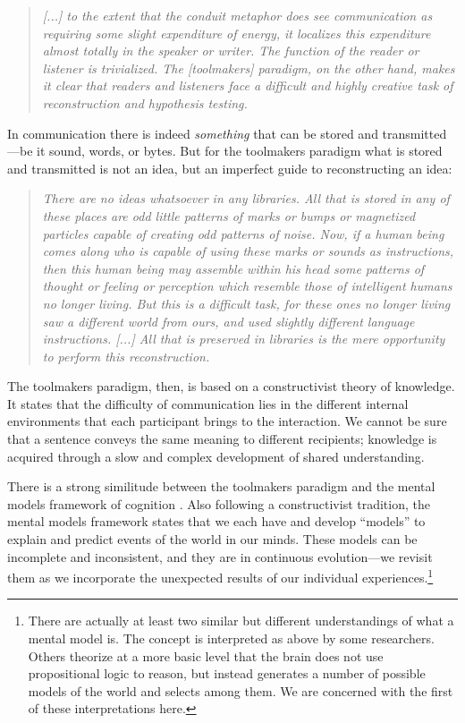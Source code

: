 \begin{quote}
\emph{[...] to the extent that the conduit metaphor does see communication as requiring some slight expenditure of energy, it localizes this expenditure almost totally in the speaker or writer. The function of the reader or listener is trivialized. The [toolmakers] paradigm, on the other hand, makes it clear that readers and listeners face a difficult and highly creative task of reconstruction and hypothesis testing.}
\end{quote}

In communication there is indeed \emph{something} that can be stored and transmitted---be it sound, words, or bytes. But for the toolmakers paradigm what is stored and transmitted is not an idea, but an imperfect guide to reconstructing an idea:

\begin{quote}
\emph{There are no ideas whatsoever in any libraries. All that is stored in any of these places are odd little patterns of marks or bumps or magnetized particles capable of creating odd patterns of noise. Now, if a human being comes along who is capable of using these marks or sounds as instructions, then this human being may assemble within his head some patterns of thought or feeling or perception which resemble those of intelligent humans no longer living. But this is a difficult task, for these ones no longer living saw a different world from ours, and used slightly different language instructions. [...] All that is preserved in libraries is the mere opportunity to perform this reconstruction.}
\end{quote}

The toolmakers paradigm, then, is based on a constructivist theory of knowledge. It states that the difficulty of communication lies in the different internal environments that each participant brings to the interaction. We cannot be sure that a sentence conveys the same meaning to different recipients; knowledge is acquired through a slow and complex development of shared understanding.

There is a strong similitude between the toolmakers paradigm and the mental models framework of cognition \cite{Rogers1992}. Also following a constructivist tradition, the mental models framework states that we each have and develop ``models'' to explain and predict events of the world in our minds. These models can be incomplete and inconsistent, and they are in continuous evolution---we revisit them as we incorporate the unexpected results of our individual experiences.\footnote{There are actually at least two similar but different understandings of what a mental model is. The concept is interpreted as above by some researchers. Others theorize at a more basic level that the brain does not use propositional logic to reason, but instead generates a number of possible models of the world and selects among them. We are concerned with the first of these interpretations here.}

